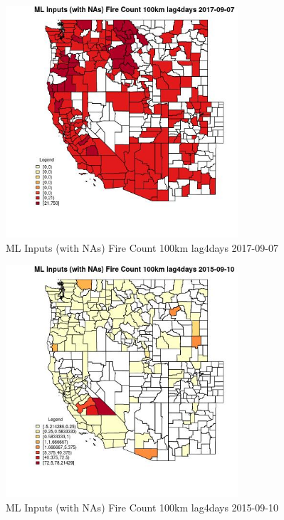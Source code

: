 \begin{figure} 
\centering  
\includegraphics[width=0.77\textwidth]{Code_Outputs/Report_ML_input_PM25_Step4_part_e_de_duplicated_aves_compiled_2019-05-21wNAs_CountyFire_Count_100km_lag4daysMean2017-09-07.jpg} 
\caption{\label{fig:Report_ML_input_PM25_Step4_part_e_de_duplicated_aves_compiled_2019-05-21wNAsCountyFire_Count_100km_lag4daysMean2017-09-07}ML Inputs (with NAs) Fire Count 100km lag4days 2017-09-07} 
\end{figure} 
 

\begin{figure} 
\centering  
\includegraphics[width=0.77\textwidth]{Code_Outputs/Report_ML_input_PM25_Step4_part_e_de_duplicated_aves_compiled_2019-05-21wNAs_CountyFire_Count_100km_lag4daysMean2015-09-10.jpg} 
\caption{\label{fig:Report_ML_input_PM25_Step4_part_e_de_duplicated_aves_compiled_2019-05-21wNAsCountyFire_Count_100km_lag4daysMean2015-09-10}ML Inputs (with NAs) Fire Count 100km lag4days 2015-09-10} 
\end{figure} 
 

